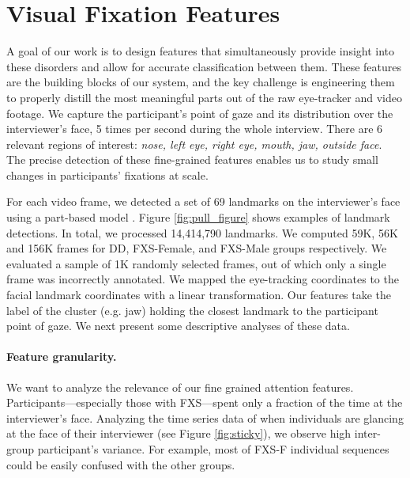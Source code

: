 \documentclass{llncs}
\begin{document}
  \vspace{-2 em}
  \section{Visual Fixation Features}
  \vspace{-1 em}
  \label{sec:feature_extraction}
A goal of our work is to design features that simultaneously provide insight into these disorders and allow for accurate classification between them. These features are the building blocks of our system, and the key challenge is engineering them to properly distill the most meaningful parts out of the raw eye-tracker and video footage. We capture the participant's point of gaze and its distribution over the interviewer's face, 5 times per second during the whole interview. There are 6 relevant regions of interest: \textit{nose, left eye, right eye, mouth, jaw, outside face}. The precise detection of these fine-grained features enables us to study small changes in participants' fixations at scale.


For each video frame, we detected a set of 69 landmarks on the interviewer's face using a part-based model \cite{dpmface}. Figure \ref{fig:pull_figure} shows examples of landmark detections. In total, we processed 14,414,790 landmarks. %
We computed 59K, 56K and 156K frames for DD, FXS-Female, and FXS-Male groups respectively. We evaluated a sample of 1K randomly selected frames, out of which only a single frame was incorrectly annotated. We mapped the eye-tracking coordinates to the facial landmark coordinates with a linear transformation. Our features take the label of the cluster (e.g. jaw) holding the closest landmark to the participant point of gaze. We next present some descriptive analyses of these data.


\paragraph{Feature granularity.} We want to analyze the relevance of our fine grained attention features.
Participants---especially those with FXS---spent only a fraction of the time at the interviewer's face. Analyzing the time series data of when individuals are glancing at the face of their interviewer (see Figure \ref{fig:sticky}), we observe high inter-group participant's variance. For example, most of FXS-F individual sequences could be easily confused with the other groups.
\end{document}
